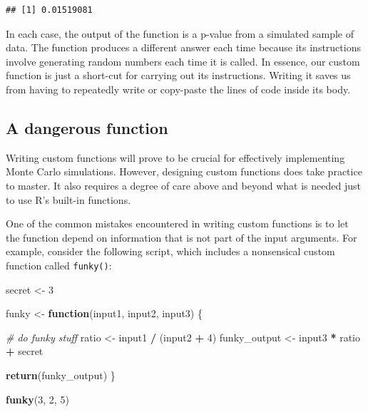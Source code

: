 \documentclass[
]{book}
\newenvironment{Shaded}{\begin{snugshade}}{\end{snugshade}}
\newcommand{\CommentTok}[1]{\textcolor[rgb]{0.56,0.35,0.01}{\textit{#1}}}
\newcommand{\ControlFlowTok}[1]{\textcolor[rgb]{0.13,0.29,0.53}{\textbf{#1}}}
\newcommand{\DecValTok}[1]{\textcolor[rgb]{0.00,0.00,0.81}{#1}}
\newcommand{\FunctionTok}[1]{\textcolor[rgb]{0.13,0.29,0.53}{\textbf{#1}}}
\newcommand{\NormalTok}[1]{#1}
\newcommand{\OtherTok}[1]{\textcolor[rgb]{0.56,0.35,0.01}{#1}}
\newcommand{\SpecialCharTok}[1]{\textcolor[rgb]{0.81,0.36,0.00}{\textbf{#1}}}
\begin{document}
\begin{verbatim}
## [1] 0.01519081
\end{verbatim}

In each case, the output of the function is a p-value from a simulated sample of data. The function produces a different answer each time because its instructions involve generating random numbers each time it is called.
In essence, our custom function is just a short-cut for carrying out its instructions.
Writing it saves us from having to repeatedly write or copy-paste the lines of code inside its body.

\subsection{A dangerous function}\label{a-dangerous-function}

Writing custom functions will prove to be crucial for effectively implementing Monte Carlo simulations.
However, designing custom functions does take practice to master.
It also requires a degree of care above and beyond what is needed just to use R's built-in functions.

One of the common mistakes encountered in writing custom functions is to let the function depend on information that is not part of the input arguments.
For example, consider the following script, which includes a nonsensical custom function called \texttt{funky()}:

\begin{Shaded}
\begin{Highlighting}[]
\NormalTok{secret }\OtherTok{\textless{}{-}} \DecValTok{3}

\NormalTok{funky }\OtherTok{\textless{}{-}} \ControlFlowTok{function}\NormalTok{(input1, input2, input3) \{}
  
  \CommentTok{\# do funky stuff}
\NormalTok{  ratio }\OtherTok{\textless{}{-}}\NormalTok{ input1 }\SpecialCharTok{/}\NormalTok{ (input2 }\SpecialCharTok{+} \DecValTok{4}\NormalTok{)}
\NormalTok{  funky\_output }\OtherTok{\textless{}{-}}\NormalTok{ input3 }\SpecialCharTok{*}\NormalTok{ ratio }\SpecialCharTok{+}\NormalTok{ secret}
  
  \FunctionTok{return}\NormalTok{(funky\_output)  }
\NormalTok{\}}

\FunctionTok{funky}\NormalTok{(}\DecValTok{3}\NormalTok{, }\DecValTok{2}\NormalTok{, }\DecValTok{5}\NormalTok{)}
\end{Highlighting}
\end{Shaded}
\end{document}
